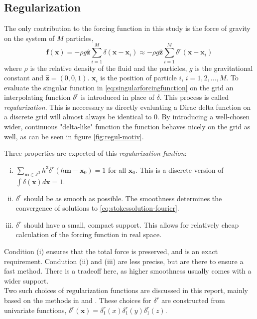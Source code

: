 \documentclass[a4paper,
twoside=false,abstract=false,numbers=noenddot,
titlepage=false,headings=small,parskip=half,version=last]{scrartcl}
\begin{document}
\subsection{Regularization\label{section:regularization}}
The only contribution to the forcing function in this study is the force of gravity on the system of $M$ particles,
\begin{equation}
\mathbf{f}(\mathbf{x}) = -\rho g\hat{\mathbf{z}}\sum_{i=1}^M \delta (\mathbf{x}-\mathbf{x}_i)\label{eq:singularforcingfunction}
\approx -\rho g\hat{\mathbf{z}}\sum_{i=1}^M \delta^{r} (\mathbf{x}-\mathbf{x}_i)
\end{equation}
where $\rho$ is the relative density of the fluid and the particles, $g$ is the gravitational constant and $\hat{\mathbf{z}}=(0,0,1)$. $\mathbf{x}_i$ is the position of particle $i$, $i=1,2,...,M$.
To evaluate the singular function in \eqref{eq:singularforcingfunction} on the grid an interpolating function $\delta^{r}$ is introduced in place of $\delta$.
This process is called \emph{regularization}.
This is neccessary as directly evaluating a Dirac delta function on a discrete grid will almost always be identical to $0$.
By introducing a well-chosen wider, continuous "delta-like" function the function behaves nicely on the grid as well, as can be seen in figure \ref{fig:regul-motiv}.

Three properties are expected of this \emph{regularization funtion}:
\begin{enumerate}[(i)]
\item $\sum_{\mathbf{m}\in \mathbb{Z}^3}h^3\delta^{r}(h\mathbf{m}-\mathbf{x}_0) = 1$ for all $\mathbf{x}_0$. This is a discrete version of $\int \delta(\mathbf{x}) d\mathbf{x}=1$.
\item $\delta^{r}$ should be as smooth as possible. The smoothness determines the convergence of solutions to \eqref{eq:stokessolution-fourier}.
\item $\delta^{r}$ should have a small, compact support. This allows for relatively cheap calculation of the forcing function in real space.
\end{enumerate}
Condition (i) ensures that the total force is preserved, and is an exact requirement.
Condution (ii) and (iii) are less precise, but are there to ensure a fast method.
There is a tradeoff here, as higher smoothness usually comes with a wider support.\\
Two such choices of regularization functions are discussed in this report, mainly based on the methods in \cite{spectralewald} and \cite{interfaceregularization}.
These choices for $\delta^{r}$ are constructed from univariate functions, $\delta^{r}(\mathbf{x}) = \delta^{r}_{1}(x) \delta^{r}_{1}(y) \delta^{r}_{1}(z)$.
\end{document}
